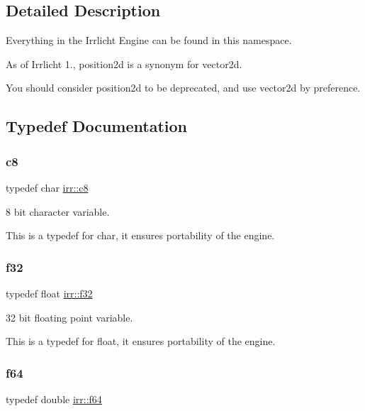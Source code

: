 \subsection{Detailed Description}
Everything in the Irrlicht Engine can be found in this namespace. 

As of Irrlicht 1., position2d is a synonym for vector2d.

You should consider position2d to be deprecated, and use vector2d by preference. 

\subsection{Typedef Documentation}
\mbox{\label{namespaceirr_a9395eaea339bcb546b319e9c96bf7410}} 
\subsubsection{\texorpdfstring{c8}{c8}}
{\footnotesize\ttfamily typedef char \hyperlink{namespaceirr_a9395eaea339bcb546b319e9c96bf7410}{irr\+::c8}}



8 bit character variable. 

This is a typedef for char, it ensures portability of the engine. \mbox{\label{namespaceirr_a0277be98d67dc26ff93b1a6a1d086b07}} 
\subsubsection{\texorpdfstring{f32}{f32}}
{\footnotesize\ttfamily typedef float \hyperlink{namespaceirr_a0277be98d67dc26ff93b1a6a1d086b07}{irr\+::f32}}



32 bit floating point variable. 

This is a typedef for float, it ensures portability of the engine. \mbox{\label{namespaceirr_a1325b02603ad449f92c68fc640af9b28}} 
\subsubsection{\texorpdfstring{f64}{f64}}
{\footnotesize\ttfamily typedef double \hyperlink{namespaceirr_a1325b02603ad449f92c68fc640af9b28}{irr\+::f64}}



